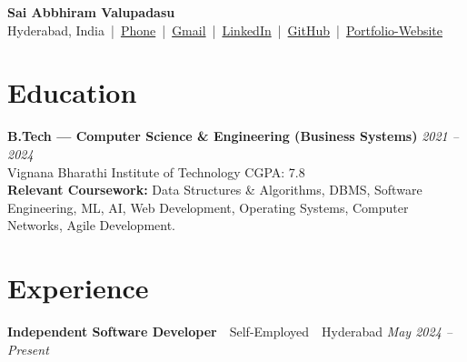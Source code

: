 \documentclass[10pt,a4paper]{article}
\begin{document}
	
	\begin{center}
		{\LARGE \textbf{Sai Abbhiram Valupadasu}}\\[6pt]
		Hyderabad, India \,|\,
		\href{tel:+91 9849786297}{Phone} \,|\,
		\href{mailto:valupadasusaiabbhiram@gmail.com}{Gmail} \,|\,
		\href{https://www.linkedin.com/in/Sai-Abbhiram-Valupadasu}{LinkedIn} \,|\,
		\href{https://github.com/ValupadasuSaiabbhiram}{GitHub} \,|\,
		\href{https://personal-portfolio-tan-nine-78.vercel.app/}{Portfolio-Website}
	\end{center}
	
	\section*{Education}
	
	\textbf{B.Tech — Computer Science \& Engineering (Business Systems)} \hfill \textit{2021 -- 2024}\\
	Vignana Bharathi Institute of Technology \hfill CGPA: 7.8 
	\vspace{0.5em}  %
	\\ \textbf{Relevant Coursework:} Data Structures \& Algorithms, DBMS, Software Engineering, ML, AI, Web Development, Operating Systems, Computer Networks, Agile Development.
	
	
	\section*{Experience}
	
	\textbf{Independent Software Developer}\, \textbar \, Self-Employed \,\textbar \, Hyderabad \hfill \textit{May 2024 -- Present}
	
\end{document}
